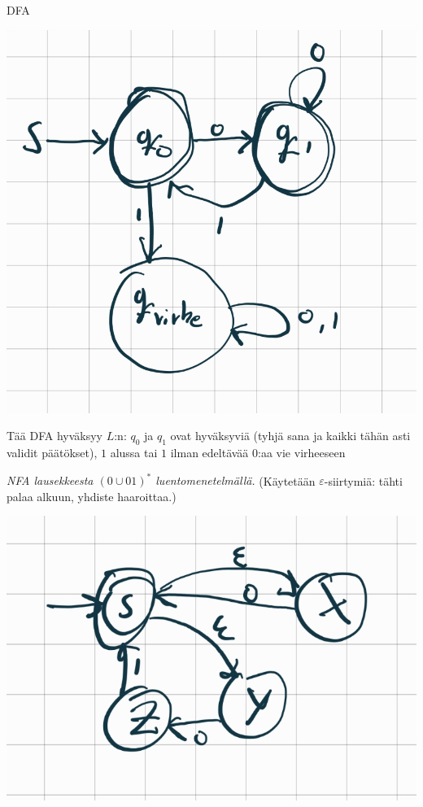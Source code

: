\documentclass[12pt,a4paper]{article}
\begin{document}
\begin{kohta}
\item DFA

\begin{center}
  \includegraphics[width=.4\textwidth]{viikko4tehtävä2_1.jpg}
\end{center}

\smallskip
Tää DFA hyväksyy $L$:n: $q_0$ ja $q_1$ ovat hyväksyviä (tyhjä sana ja
kaikki tähän asti validit päätökset), $1$ alussa tai $1$ ilman edeltävää $0$:aa
vie virheeseen

\item \emph{NFA lausekkeesta \((0\cup 01)^*\) luentomenetelmällä.}
(Käytetään $\varepsilon$-siirtymiä: tähti palaa alkuun, yhdiste haaroittaa.)

\begin{center}
  \includegraphics[width=.4\textwidth]{viikko4tehtävä2_2.jpg}
\end{center}



\end{kohta}
\end{document}
